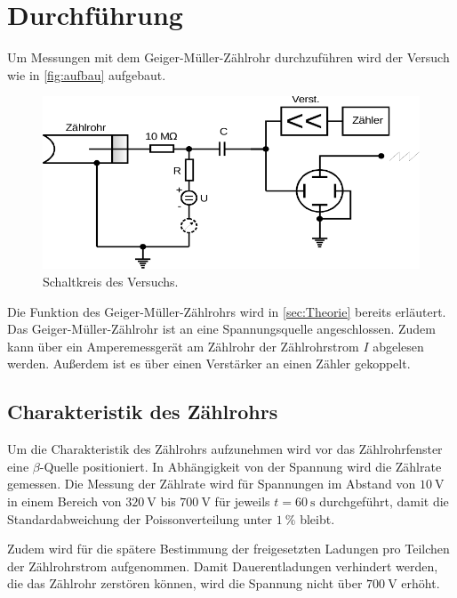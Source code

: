 \section{Durchführung}
\label{sec:Durchführung}

Um Messungen mit dem Geiger-Müller-Zählrohr durchzuführen wird der Versuch wie in \autoref{fig:aufbau} aufgebaut.
\begin{figure}[H]
    \centering
    \includegraphics{Abbildungen/Abb_5.pdf}
    \caption {Schaltkreis des Versuchs.\cite{V703}}
    \label{fig:aufbau}
\end{figure}
Die Funktion des Geiger-Müller-Zählrohrs wird in \autoref{sec:Theorie} bereits erläutert.
Das Geiger-Müller-Zählrohr ist an eine Spannungsquelle angeschlossen. Zudem kann über ein Amperemessgerät am Zählrohr der
Zählrohrstrom $I$ abgelesen werden.
Außerdem ist es über einen Verstärker an einen Zähler gekoppelt.


\subsection{Charakteristik des Zählrohrs}
\label{sub:charakteristik_durch}

Um die Charakteristik des Zählrohrs aufzunehmen wird vor das Zählrohrfenster eine $\beta$-Quelle positioniert.
In Abhängigkeit von der Spannung wird die Zählrate gemessen.
Die Messung der Zählrate wird für Spannungen im Abstand von $\qty{10}{\volt}$ in einem Bereich von $\qty{320}{\volt}$ bis $\qty{700}{\volt}$ 
für jeweils $t=\qty{60}{\second}$ durchgeführt, damit die Standardabweichung der Poissonverteilung unter $\qty{1}{\percent}$ bleibt.

Zudem wird für die spätere Bestimmung der freigesetzten Ladungen pro Teilchen der Zählrohrstrom aufgenommen.
Damit Dauerentladungen verhindert werden, die das Zählrohr zerstören können, wird die Spannung nicht über $\qty{700}{\volt}$ erhöht.


